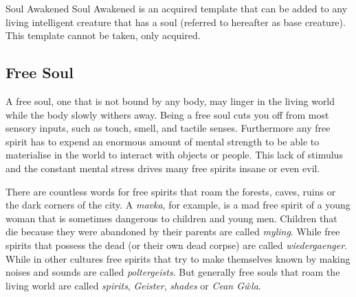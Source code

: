 \begin{35e}{Soul Awakened}
Soul Awakened is an acquired template that can be added to any living
intelligent creature that has a soul (referred to hereafter as base
creature). This template cannot be taken, only acquired.
\end{35e}

\subsection{Free Soul}
\label{sec:Free Soul}

A free soul, one that is not bound by any body, may linger in the living world
while the body slowly withers away. Being a free soul cuts you off from most
sensory inputs, such as touch, smell, and tactile senses. Furthermore any free
spirit has to expend an enormous amount of mental strength to be able to
materialise in the world to interact with objects or people. This lack of
stimulus and the constant mental stress drives many free spirits insane or
even evil.

There are countless words for free spirits that roam the forests, caves, ruins
or the dark corners of the city. A \emph{mavka}, for example, is a mad free
spirit of a young woman that is sometimes dangerous to children and young men.
Children that die because they were abandoned by their parents are called
\emph{myling}. While free spirits that possess the dead (or their own dead
corpse) are called \emph{wiedergaenger}. While in other cultures free spirits
that try to make themselves known by making noises and sounds are called
\emph{poltergeists}. But generally free souls that roam the living world are
called \emph{spirits}, \emph{Geister}, \emph{shades} or \emph{Cean Gŵla}.

